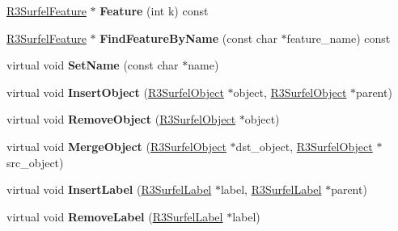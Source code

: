 \begin{DoxyCompactItemize}
\item 
\hyperlink{class_r3_surfel_feature}{R3\+Surfel\+Feature} $\ast$ {\bfseries Feature} (int k) const \hypertarget{class_r3_surfel_scene_aa791b22ec9717bdea2dce94017d1c299}{}\label{class_r3_surfel_scene_aa791b22ec9717bdea2dce94017d1c299}

\item 
\hyperlink{class_r3_surfel_feature}{R3\+Surfel\+Feature} $\ast$ {\bfseries Find\+Feature\+By\+Name} (const char $\ast$feature\+\_\+name) const \hypertarget{class_r3_surfel_scene_a4c9ac9086beaece12a51dc4d764db3d5}{}\label{class_r3_surfel_scene_a4c9ac9086beaece12a51dc4d764db3d5}

\item 
virtual void {\bfseries Set\+Name} (const char $\ast$name)\hypertarget{class_r3_surfel_scene_ab1597ca57353375b0192657bed019ee7}{}\label{class_r3_surfel_scene_ab1597ca57353375b0192657bed019ee7}

\item 
virtual void {\bfseries Insert\+Object} (\hyperlink{class_r3_surfel_object}{R3\+Surfel\+Object} $\ast$object, \hyperlink{class_r3_surfel_object}{R3\+Surfel\+Object} $\ast$parent)\hypertarget{class_r3_surfel_scene_a297d021200f2187c2bf56770fa9961f4}{}\label{class_r3_surfel_scene_a297d021200f2187c2bf56770fa9961f4}

\item 
virtual void {\bfseries Remove\+Object} (\hyperlink{class_r3_surfel_object}{R3\+Surfel\+Object} $\ast$object)\hypertarget{class_r3_surfel_scene_ae2d77aefc703271af5ef294346d2a489}{}\label{class_r3_surfel_scene_ae2d77aefc703271af5ef294346d2a489}

\item 
virtual void {\bfseries Merge\+Object} (\hyperlink{class_r3_surfel_object}{R3\+Surfel\+Object} $\ast$dst\+\_\+object, \hyperlink{class_r3_surfel_object}{R3\+Surfel\+Object} $\ast$src\+\_\+object)\hypertarget{class_r3_surfel_scene_a2b7156bc0316f89246c20b95bff478b3}{}\label{class_r3_surfel_scene_a2b7156bc0316f89246c20b95bff478b3}

\item 
virtual void {\bfseries Insert\+Label} (\hyperlink{class_r3_surfel_label}{R3\+Surfel\+Label} $\ast$label, \hyperlink{class_r3_surfel_label}{R3\+Surfel\+Label} $\ast$parent)\hypertarget{class_r3_surfel_scene_aa7edafa9893be74dc43b319121ebefeb}{}\label{class_r3_surfel_scene_aa7edafa9893be74dc43b319121ebefeb}

\item 
virtual void {\bfseries Remove\+Label} (\hyperlink{class_r3_surfel_label}{R3\+Surfel\+Label} $\ast$label)\hypertarget{class_r3_surfel_scene_af1660e17332532370fba91b27da37588}{}\label{class_r3_surfel_scene_af1660e17332532370fba91b27da37588}


\end{DoxyCompactItemize}
